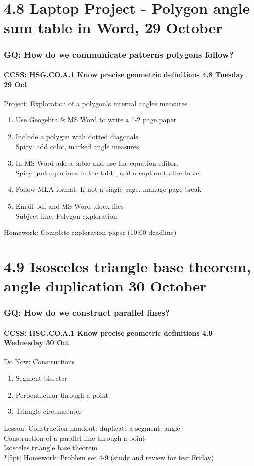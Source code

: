 \documentclass{beamer}
\begin{document}
\section{4.8 Laptop Project - Polygon angle sum table in Word, 29 October}
\frame
{
\frametitle{GQ: How do we communicate patterns polygons follow?}
\framesubtitle{CCSS: HSG.CO.A.1 Know precise geometric definitions \hfill \alert{4.8 Tuesday 29 Oct}}

\begin{block}{Project: Exploration of a polygon's internal angles measures}
\begin{enumerate}
  \item Use Geogebra \& MS Word to write a 1-2 page paper
  \item Include a polygon with dotted diagonals. \\
  Spicy: add color, marked angle measures
  \item In MS Word add a table and use the equation editor. \\
  Spicy: put equations in the table, add a caption to the table
  \item Follow MLA format. If not a single page, manage  page break
  \item Email pdf and MS Word .docx files \\
  Subject line: Polygon exploration
\end{enumerate}
\end{block}
Homework: Complete exploration paper (10:00 deadline)
}

\section{4.9 Isosceles triangle base theorem, angle duplication 30 October}
\frame
{
  \frametitle{GQ: How do we construct parallel lines?}
  \framesubtitle{CCSS: HSG.CO.A.1 Know precise geometric definitions \hfill \alert{4.9 Wednesday 30 Oct}}

  \begin{block}{Do Now: Constructions}
  \begin{enumerate}
    \item Segment bisector
    \item Perpendicular through a point
    \item Triangle circumcenter
  \end{enumerate}
  \end{block}
  Lesson: Construction handout: duplicate a segment, angle \\
  Construction of a parallel line through a point\\
  Isosceles triangle base theorem \\*[5pt]
  Homework: Problem set 4-9 (study and review for test \alert{Friday})
}
\end{document}
